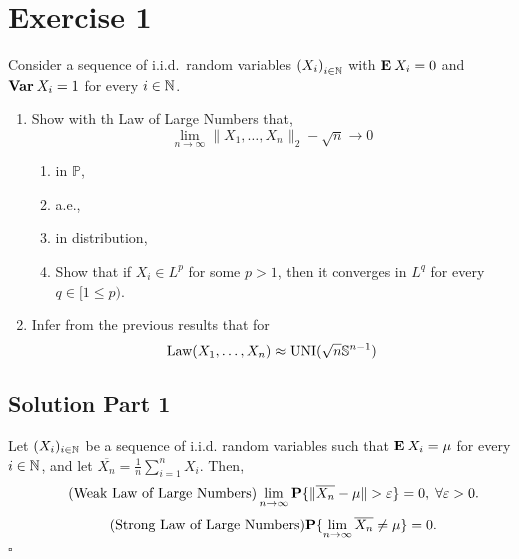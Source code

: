 
\section{Exercise 1}
Consider a sequence of i.i.d.~random variables ${(X_i)}_{i\in\N}$ with $\E X_i = 0$ and $\Var X_i = 1$ for every $i\in \N$.

\begin{enumerate}
    \item Show with th Law of Large Numbers that,
    \[ \lim_{n\to\infty} \|X_1,\ldots,X_n\|_2 - \sqrt{n} \to 0 \]
    \begin{enumerate}[label=(\alph*)]
        \item in $\mathbb{P}$,
        \item a.e.,
        \item in distribution,
        \item Show that if $X_i \in L^p$ for some $p>1$, then it converges in $L^q$ for every $q \in [1\leq p)$.
    \end{enumerate} 
    \item Infer from the previous results that for
    \[ \text{Law}(X_1 , \ldots, X_n) \approx \text{UNI}(\sqrt{n} \S^{n-1}) \]
\end{enumerate}

\subsection*{Solution Part 1}

\begin{theorem}\label{loln}
Let $(X_i)_{i\in\N}$ be a sequence of i.i.d. random variables such that $\E X_i = \mu$ for every $i\in\N$, and let $\overline{X_n} = \frac{1}{n} \sum_{i = 1}^n X_i$. Then,
\begin{equation}\label{wloln}\tag{Weak Law of Large Numbers}
    \lim_{n\to\infty} \P\{\|\overline{X_n} - \mu\| > \varepsilon\} = 0,\;\forall \varepsilon > 0.
\end{equation}
\begin{equation}\label{sloln}\tag{Strong Law of Large Numbers}
    \P\{\lim_{n\to\infty} \overline{X_n} \neq \mu\} = 0.
\end{equation}
\hfill $\square$
\end{theorem}

